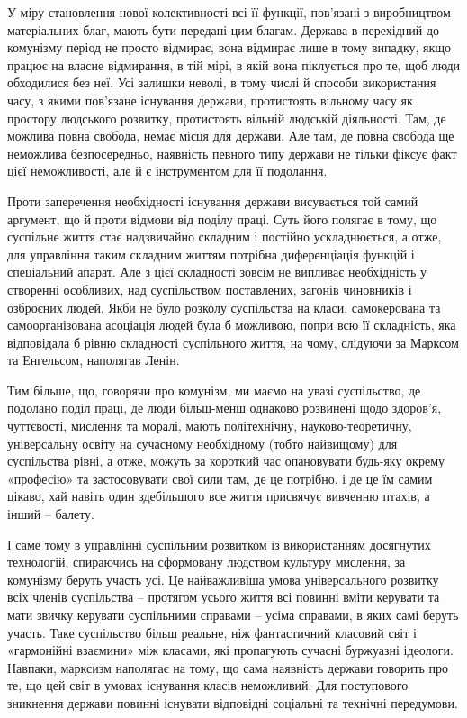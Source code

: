 \documentclass[12pt,a4paper,openany]{book}
\begin{document}
У міру становлення нової колективності всі її функції, пов’язані з виробництвом матеріальних благ, мають бути передані цим благам. Держава в перехідний до комунізму період не просто відмирає, вона відмирає лише в тому випадку, якщо працює на власне відмирання, в тій мірі, в якій вона піклується про те, щоб люди обходилися без неї. Усі залишки неволі, в тому числі й способи використання часу, з якими пов’язане існування держави, протистоять вільному часу як простору людського розвитку, протистоять вільній людській діяльності. Там, де можлива повна свобода, немає місця для держави. Але там, де повна свобода ще неможлива безпосередньо, наявність певного типу держави не тільки фіксує факт цієї неможливості, але й є інструментом для її подолання.

Проти заперечення необхідності існування держави висувається той самий аргумент, що й проти відмови від поділу праці. Суть його полягає в тому, що суспільне життя стає надзвичайно складним і постійно ускладнюється, а отже, для управління таким складним життям потрібна диференціація функцій і спеціальний апарат. Але з цієї складності зовсім не випливає необхідність у створенні особливих, над суспільством поставлених, загонів чиновників і озброєних людей. Якби не було розколу суспільства на класи, самокерована та самоорганізована асоціація людей була б можливою, попри всю її складність, яка відповідала б рівню складності суспільного життя, на чому, слідуючи за Марксом та Енгельсом, наполягав Ленін.

Тим більше, що, говорячи про комунізм, ми маємо на увазі суспільство, де подолано поділ праці, де люди більш-менш однаково розвинені щодо здоров’я, чуттєвості, мислення та моралі, мають політехнічну, науково-теоретичну, універсальну освіту на сучасному необхідному (тобто найвищому) для суспільства рівні, а отже, можуть за короткий час опановувати будь-яку окрему «професію» та застосовувати свої сили там, де це потрібно, і де це їм самим цікаво, хай навіть один здебільшого все життя присвячує вивченню птахів, а інший – балету.

І саме тому в управлінні суспільним розвитком із використанням досягнутих технологій, спираючись на сформовану людством культуру мислення, за комунізму беруть участь усі. Це найважливіша умова універсального розвитку всіх членів суспільства – протягом усього життя всі повинні вміти керувати та мати звичку керувати суспільними справами – усіма справами, в яких самі беруть участь. Таке суспільство більш реальне, ніж фантастичний класовий світ і «гармонійні взаємини» між класами, які пропагують сучасні буржуазні ідеологи. Навпаки, марксизм наполягає на тому, що сама наявність держави говорить про те, що цей світ в умовах існування класів неможливий. Для поступового зникнення держави повинні існувати відповідні соціальні та технічні передумови.
\end{document}
